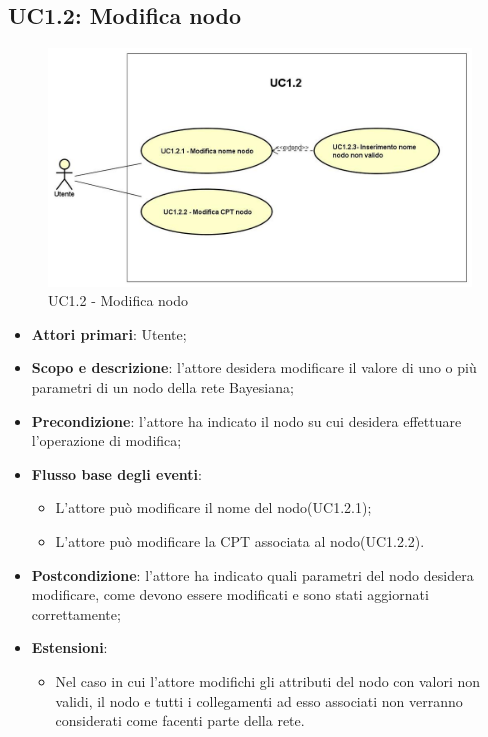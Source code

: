 \subsection{UC1.2: Modifica nodo} 
\hypertarget{UC1.2}{} 
\begin{figure} [H]
	\centering
	\includegraphics[scale=0.45]{Img/UC1-2} 
	\caption{UC1.2 - Modifica nodo} \label{} 
\end{figure} 
\begin{itemize} 
	\item{\textbf{Attori primari}: Utente;} 
	\item{\textbf{Scopo e descrizione}: l'attore desidera modificare il valore di uno o più parametri di un nodo della rete Bayesiana;} 
	\item{\textbf{Precondizione}: l'attore ha indicato il nodo su cui desidera effettuare l'operazione di modifica;} 
	\item{\textbf{Flusso base degli eventi}: } 
	\begin{itemize} 
		\item{L'attore può modificare il nome del nodo(UC1.2.1);} 
		\item{L'attore può modificare la CPT associata al nodo(UC1.2.2).} 		
	\end{itemize} 
	\item{\textbf{Postcondizione}: l'attore ha indicato quali parametri del nodo desidera modificare, come devono essere modificati e sono stati aggiornati correttamente;} 
	\item{\textbf{Estensioni}:} 
	\begin{itemize} 
		\item{Nel caso in cui l'attore modifichi gli attributi del nodo con valori non validi, il nodo e tutti i collegamenti ad esso associati non verranno considerati come facenti parte della rete.} 
	\end{itemize} 
\end{itemize} 

